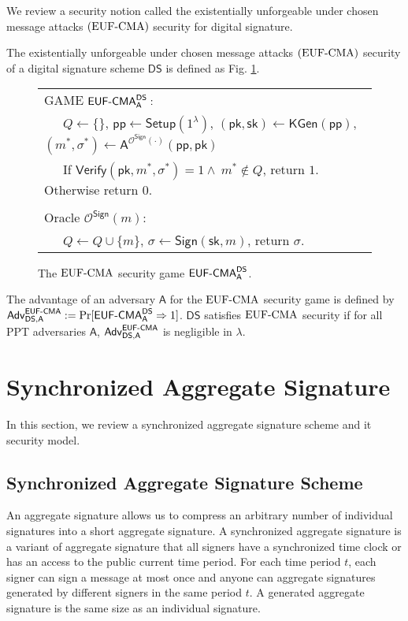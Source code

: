 \documentclass[a4paper,11pt]{fullverllncs}
\newcommand{\A}{\mathsf{A}}
\newcommand{\Adv}{\mathsf{Adv}}
\newcommand{\DS}{\mathsf{DS}}
\newcommand{\sk}{\mathsf{sk}}
\newcommand{\pk}{\mathsf{pk}}
\newcommand{\pp}{\mathsf{pp}}
\newcommand{\Setup}{\mathsf{Setup}}
\newcommand{\KGen}{\mathsf{KGen}}
\newcommand{\Sign}{\mathsf{Sign}}
\newcommand{\Verify}{\mathsf{Verify}}
\newcommand{\EUFCMA}{\mathsf{EUF \mathchar`- CMA}}
\newcommand{\rmEUFCMA}{\mathrm{EUF}\mathchar`-\mathrm{CMA}}
\begin{document}
We review a security notion called the existentially unforgeable under chosen message attacks $(\rmEUFCMA)$ security for digital signature.

\begin{definition}
The existentially unforgeable under chosen message attacks $(\rmEUFCMA)$ security of a digital signature scheme $\DS$ is defined as Fig. \ref{EUFCMAgame}.

\begin{figure}[h]
\centering
\begin{tabular}{|l|}
\hline
GAME $\EUFCMA^{\DS}_{\A}:$\\
~~~$Q \leftarrow \{\}$, $\pp \leftarrow \Setup (1^{\lambda})$, $(\pk, \sk) \leftarrow \KGen(\pp)$, $(m^*, \sigma^*) \leftarrow \A^{\mathcal{O}^{\Sign}(\cdot)}(\pp, \pk)$\\
~~~If $\Verify(\pk, m^*, \sigma^*) = 1 \land ~ m^* \notin Q$, return $1$. Otherwise return $0$.\\
\\
Oracle $\mathcal{O}^{\Sign}(m):$\\
~~~$Q \leftarrow Q \cup \{m\}$, $\sigma \leftarrow \Sign(\sk, m)$, return $\sigma$.\\
\hline
\end{tabular}
\caption{\small
The $\rmEUFCMA$ security game $\EUFCMA^{\DS}_{\A}$.}
\label{EUFCMAgame}
\end{figure}

The advantage of an adversary $\A$ for the $\rmEUFCMA$ security game is defined by $\Adv^{\EUFCMA}_{\DS, \A}:= \Pr[\EUFCMA^{\DS}_{\A} \Rightarrow 1]$.
$\DS$ satisfies $\rmEUFCMA$ security if for all PPT adversaries $\A$, $\Adv^{\EUFCMA}_{\DS, \A}$ is negligible in $\lambda$.
\end{definition}




\section{Synchronized Aggregate Signature} \label{SecSyncAggSig}
In this section, we review a synchronized aggregate signature scheme and it security model.


\subsection{Synchronized Aggregate Signature Scheme}
An aggregate signature \cite{BGLS03} allows us to compress an arbitrary number of individual signatures into a short aggregate signature.
A synchronized aggregate signature \cite{AGH10} is a variant of aggregate signature that all signers have a synchronized time clock or has an access to the public current time period.
For each time period $t$, each signer can sign a message at most once and anyone can aggregate signatures generated by different signers in the same period $t$.
A generated aggregate signature is the same size as an individual signature.
\end{document}
